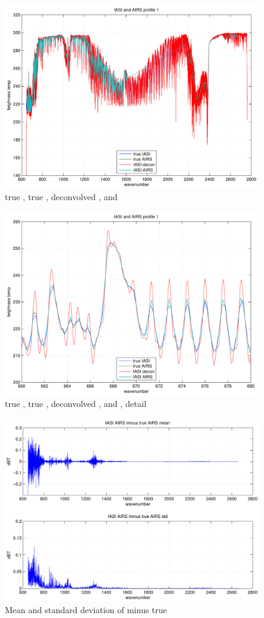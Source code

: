 \documentclass[12pt]{article}
\begin{document}
\begin{figure}
  \centering
  \includegraphics[height=8cm]{figures/iasi_airs_spec.pdf}
  \caption{true {\iasi}, true {\airs}, deconvolved {\iasi}, and
    {\iasi} {\airs} }
  \label{iaspec}
\end{figure}

\begin{figure}
  \centering
  \includegraphics[height=8cm]{figures/iasi_airs_zoom.pdf}
  \caption{true {\iasi}, true {\airs}, deconvolved {\iasi}, and
    {\iasi} {\airs}, detail }
  \label{iazoom}
\end{figure}

\begin{figure}
  \centering
  \includegraphics[height=8cm]{figures/iasi_airs_diff.pdf}
  \caption{Mean and standard deviation of {\iasi} {\airs} minus true
    {\airs} }
  \label{iadiff}
\end{figure}
\end{document}
